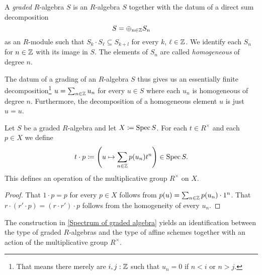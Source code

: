 \begin{definition}
  A \emph{graded} $R$-algebra $S$ is an $R$-algebra $S$ together with the datum of a direct sum decomposition
  \begin{equation*}
    S = \oplus_{n \in \mathbb{Z}} S_n
  \end{equation*}
  as an $R$-module such that $S_k \cdot S_\ell \subseteq S_{k + l}$
  for every $k$, $\ell \in \mathbb{Z}$.  We identify each $S_n$ for $n \in \mathbb{Z}$
  with its image in $S$.  The elements of $S_n$ are called \emph{homogeneous} of degree $n$.
\end{definition}

\begin{remark}
  The datum of a grading of an $R$-algebra $S$ thus gives us an
  essentially finite decomposition\footnote{That means there merely are $i,j:\mathbb{Z}$ such that $u_n=0$ if $n<i$ or $n>j$.}
  $u = \sum_{n \in \mathbb{Z}} u_n$ for every
  $u \in S$ where each $u_n$ is homogeneous of degree $n$.
  Furthermore, the decomposition of a homogeneous element $u$ is just $u = u$.
\end{remark}

\begin{proposition}
  \label{Spectrum of graded algebra}
  Let $S$ be a graded $R$-algebra and let $X \coloneqq \operatorname{Spec} S$.  For each $t \in R^\times$ and each $p \in X$ we define
  \begin{equation*}
    t \cdot p \coloneqq \left(u \mapsto \sum_{n \in \mathbb{Z}} p(u_n) t^n\right) \in \operatorname{Spec} S.
  \end{equation*}
  This defines an operation of the multiplicative group $R^\times$ on $X$.
\end{proposition}

\begin{proof}
  That $1 \cdot p = p$ for every $p \in X$ follows from
  $p(u) = \sum_{n \in \mathbb{Z}} p(u_n)\cdot 1^n$.  That
  $r \cdot (r' \cdot p) = (r \cdot r') \cdot p$ follows from the
  homogeneity of every $u_n$.
\end{proof}

\begin{theorem}
  The construction in \cref{Spectrum of graded algebra} yields an
  identification between the type of graded $R$-algebras and the type
  of affine schemes together with an action of the multiplicative
  group $R^\times$.
\end{theorem}

